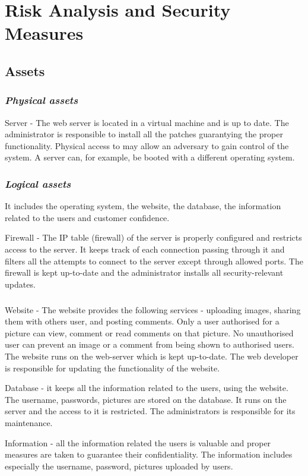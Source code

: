 \section{Risk Analysis and Security Measures}

\subsection{Assets}

\subsubsection{{\it Physical assets}}
Server - The web server is located in a virtual machine and is up to date. The administrator is responsible to install all the patches guarantying the proper functionality. 
Physical access to may allow an adversary to gain control of the system. A server can,
for example, be booted with a different operating system.

\subsubsection{{\it Logical assets}}
It includes the operating system, the website, the database, the information related to the users and customer confidence. 

Firewall - The IP table (firewall) of the server is properly configured and restricts access to the server. It keeps track of each connection passing through it and filters all the attempts to connect to the server except through allowed ports. The firewall is kept up-to-date and the administrator installs all security-relevant updates.

\subparagraph{} Website - The website provides the following services - uploading images, sharing them with others user, and posting comments. Only a user authorised for a picture can view, comment or read comments on that picture. No unauthorised user can prevent an image or a comment from being shown to authorised users. The website runs on the web-server which is kept up-to-date. The web developer is responsible for updating the functionality of the website. 

Database - it keeps all the information related to the users, using the website. The username, passwords, pictures are stored on the database. It runs on the server and the access to it is restricted. The administrators is responsible for its maintenance.

Information - all the information related the users is valuable and proper measures are taken to guarantee their confidentiality. The information includes especially the username, password, pictures uploaded by users. 

